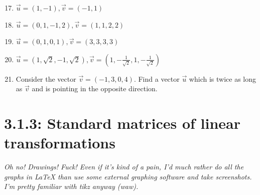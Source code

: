\documentclass{article}
\begin{document}
\begin{enumerate}
    \setcounter{enumi}{16}
    \item \(\overrightarrow{u} = (1,-1), \overrightarrow{v} = (-1,1)\)
    \item \(\overrightarrow{u} = (0,1,-1,2), \overrightarrow{v} = (1,1,2,2)\)
    \item \(\overrightarrow{u} = (0,1,0,1), \overrightarrow{v} = (3,3,3,3)\)
    \item \(\overrightarrow{u} = (1,\sqrt{2},-1,\sqrt{2}), \overrightarrow{v} = (1,-\frac{1}{\sqrt{2}},1,-\frac{1}{\sqrt{2}})\)
    \item Consider the vector \(\overrightarrow{v} = (-1,3,0,4)\). Find a vector \(\overrightarrow{u}\) which is twice as long as \(\overrightarrow{v}\) and is pointing in the opposite direction.
\end{enumerate}
\pagebreak

\section*{3.1.3: Standard matrices of linear transformations}
\textit{Oh no! Drawings! Fuck! Even if it's kind of a pain, I'd much rather do all the graphs in \LaTeX{} than use some external graphing software and take screenshots. I'm pretty familiar with tikz anyway (waw). }
\pagebreak 
\end{document}
